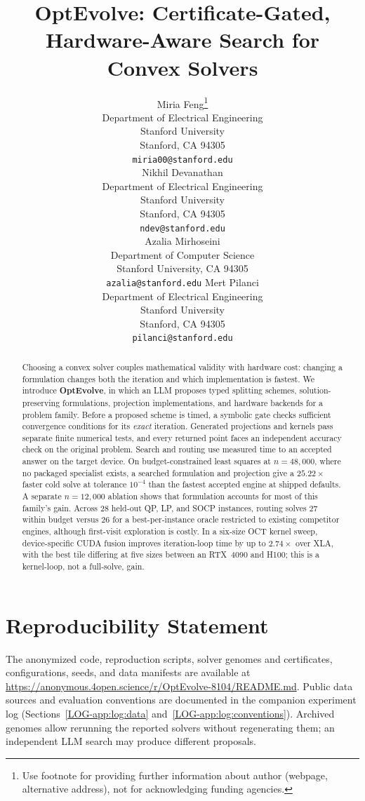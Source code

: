 \documentclass{article}
\title{OptEvolve: Certificate-Gated, Hardware-Aware Search for Convex Solvers}
\author{%
  Miria Feng\thanks{Use footnote for providing further information
    about author (webpage, alternative address), not for acknowledging
    funding agencies.} \\
  Department of Electrical Engineering\\
  Stanford University\\
  Stanford, CA 94305 \\
  \texttt{miria00@stanford.edu} \\
  \And
  Nikhil Devanathan \\
  Department of Electrical Engineering \\
  Stanford University \\
  Stanford, CA 94305 \\
  \texttt{ndev@stanford.edu} \\
  \And
  Azalia Mirhoseini \\
    Department of Computer Science \\
    Stanford University, CA 94305 \\
    \texttt{azalia@stanford.edu}
    \And
  Mert Pilanci \\
  Department of Electrical Engineering \\
  Stanford University \\
  Stanford, CA 94305 \\
  \texttt{pilanci@stanford.edu} \\
}
\theoremstyle{definition}
\theoremstyle{remark}
\begin{document}
\maketitle


\begin{abstract}
Choosing a convex solver couples mathematical validity with hardware cost:
changing a formulation changes both the iteration and which implementation is
fastest. We introduce \textbf{OptEvolve}, in which an LLM proposes typed
splitting schemes, solution-preserving formulations, projection implementations, and
hardware backends for a problem family. Before a proposed scheme is timed, a
symbolic gate checks sufficient convergence conditions for its \emph{exact}
iteration. Generated projections and kernels pass separate finite numerical
tests, and every returned point faces an independent accuracy check on the
original problem. Search and routing use measured time to an accepted answer
on the target device. On budget-constrained least squares at $n=48{,}000$,
where no packaged specialist exists, a searched formulation and projection
give a $25.22\times$ faster cold solve at tolerance $10^{-4}$ than the fastest
accepted engine at shipped defaults. A separate $n=12{,}000$ ablation shows
that formulation accounts for most of this family's gain. Across $28$
held-out QP, LP, and SOCP instances, routing solves $27$
within budget versus $26$ for a best-per-instance oracle restricted to
existing competitor engines, although first-visit exploration is costly. In a
six-size OCT kernel sweep, device-specific CUDA fusion improves iteration-loop
time by up to $2.74\times$ over XLA, with the best tile differing at five sizes
between an RTX~4090 and H100; this is a kernel-loop, not a full-solve, gain.
\end{abstract}












\section*{Reproducibility Statement}
The anonymized code, reproduction scripts, solver genomes and certificates,
configurations, seeds, and data manifests are available at
\url{https://anonymous.4open.science/r/OptEvolve-8104/README.md}.
Public data sources and evaluation conventions are documented in the companion
experiment log (Sections~\ref{LOG-app:log:data} and~\ref{LOG-app:log:conventions}).
Archived genomes allow rerunning the reported solvers without regenerating
them; an independent LLM search may produce different proposals.
\end{document}
